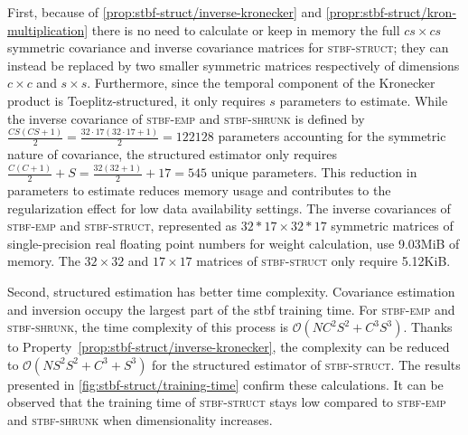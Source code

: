	First, because of \cref{prop:stbf-struct/inverse-kronecker} and
	\cref{propr:stbf-struct/kron-multiplication} there is no need to calculate or keep in memory the full $cs\times cs$
	symmetric covariance and inverse covariance matrices for \textsc{stbf-struct}; they can instead be replaced by two smaller symmetric matrices respectively of dimensions $c\times c$ and $s\times s$.
	Furthermore, since the temporal component of the Kronecker product is
	Toeplitz-structured, it only requires $s$ parameters to
	estimate.
	While the inverse covariance of \textsc{stbf-emp} and \textsc{stbf-shrunk} is
	defined by $\frac{CS(CS+1)}{2}=\frac{32\cdot17(32\cdot17+1)}{2}=\num{122128}$
	parameters accounting for the symmetric nature of
	covariance, the structured estimator only requires $\frac{C(C+1)}{2} + S =
		\frac{32(32+1)}{2} + 17=545$ unique parameters.
	This reduction in parameters to estimate reduces memory usage and contributes to the regularization effect for low data availability settings.
	The inverse covariances of \textsc{stbf-emp} and
	\textsc{stbf-struct}, represented as $32*17\times 32*17$ symmetric matrices of
	single-precision real floating point numbers for weight calculation,
	use 9.03MiB of memory.
	The $32\times 32$ and $17\times 17$ matrices of \textsc{stbf-struct} only
	require 5.12KiB.

	Second, structured estimation has better time complexity.
	Covariance estimation and inversion occupy the largest part of the \ac{stbf} training time.
	For \textsc{stbf-emp} and \textsc{stbf-shrunk}, the time complexity of this process is $\mathcal{O}(NC^2S^2+C^3S^3)$.
	Thanks to Property~\ref{prop:stbf-struct/inverse-kronecker}, the complexity can be reduced to
	$\mathcal{O}(NS^2S^2+C^3+S^3)$ for the structured estimator of \textsc{stbf-struct}.
	The results presented in \cref{fig:stbf-struct/training-time} confirm these
	calculations.
	It can be observed that the training time of \textsc{stbf-struct} stays low compared to \textsc{stbf-emp} and \textsc{stbf-shrunk} when dimensionality increases.

